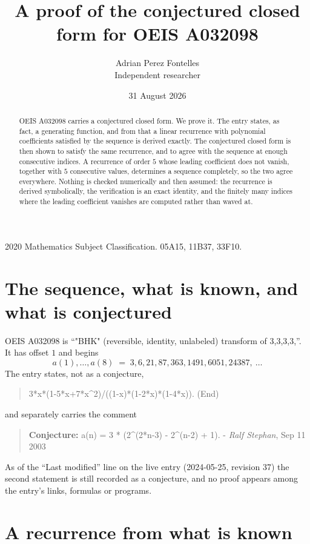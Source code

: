 \documentclass[11pt,a4paper]{article}
\title{A proof of the conjectured closed form for OEIS A032098}
\author{Adrian Perez Fontelles\\ \small Independent researcher}
\date{31 August 2026}
\theoremstyle{plain}
\theoremstyle{definition}
\begin{document}
\maketitle

\begin{abstract}
OEIS A032098 carries a conjectured closed form. We prove it. The entry states, as fact,
a generating function, and from that a linear recurrence with polynomial coefficients satisfied by
the sequence is derived exactly. The conjectured closed form is then shown to satisfy the
same recurrence, and to agree with the sequence at enough consecutive indices. A recurrence
of order $5$ whose leading coefficient does not vanish, together with $5$
consecutive values, determines a sequence completely, so the two agree everywhere. Nothing
is checked numerically and then assumed: the recurrence is derived symbolically, the
verification is an exact identity, and the finitely many indices where the leading
coefficient vanishes are computed rather than waved at.
\end{abstract}

\noindent\small 2020 Mathematics Subject Classification. 05A15, 11B37, 33F10.\normalsize

\section{The sequence, what is known, and what is conjectured}

OEIS A032098 is ``"BHK" (reversible, identity, unlabeled) transform of 3,3,3,3,''. It has offset $1$ and begins
\[
a(1),\dots,a(8)\;=\;3, 6, 21, 87, 363, 1491, 6051, 24387,\ \dots
\]
The entry states, not as a conjecture,
\begin{quote}\small
3*x*(1-5*x+7*x\textasciicircum{}2)/((1-x)*(1-2*x)*(1-4*x)). (End)
\end{quote}
and separately carries the comment
\begin{quote}\small
\textbf{Conjecture:} a(n) = 3 * (2\textasciicircum{}(2*n-3) - 2\textasciicircum{}(n-2) + 1). - \emph{Ralf Stephan}, Sep 11 2003
\end{quote}
As of the ``Last modified'' line on the live entry (2024-05-25, revision 37) the second
statement is still recorded as a conjecture, and no proof appears among the entry's links,
formulas or programs.

\section{A recurrence from what is known}
\end{document}
